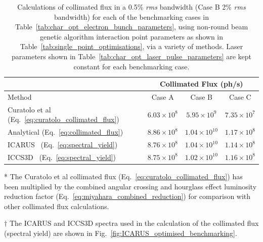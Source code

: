 \documentclass[../main.tex]{subfiles}
\begin{document}
\begin{table}[!h]
\centering
\caption{Calculations of collimated flux in a 0.5\% \textit{rms} bandwidth (Case B 2\% \textit{rms} bandwidth) for each of the benchmarking cases in Table~\ref{tab:char_opt_electron_bunch_parameters}, using non-round beam genetic algorithm interaction point parameters as shown in Table~\ref{tab:single_point_optimisations}, via a variety of methods. Laser parameters shown in Table~\ref{tab:char_opt_laser_pulse_parameters} are kept constant for each benchmarking case.}
\vspace{3mm}
\begin{threeparttable}
\begin{tabular}{lccc}
\hline\hline
 & \multicolumn{3}{c}{Collimated Flux (ph/\si{\second})} \\
\hline
Method & Case A & Case B & Case C \\
\hline 
Curatolo et al~\tnote{*} (Eq.~\ref{eq:curatolo_collimated_flux}) \cite{curatolo2017analytical} & $6.03 \times 10^{8}$ & $5.95\times 10^{9}$ & $7.35\times 10^{7}$ \\
Analytical (Eq.~\ref{eq:collimated_flux}) & $8.86 \times 10^{8}$ & $1.04 \times 10^{10}$ & $1.17\times 10^{8}$ \\
\textsc{ICARUS}~\tnote{$\dagger$} (Eq.~\ref{eq:spectral_yield}) & $8.76\times 10^{8}$ & $1.04\times 10^{10}$ & $1.14\times 10^{8}$ \\
\textsc{ICCS3D}~\tnote{$\dagger$} (Eq.~\ref{eq:spectral_yield}) \cite{krafft2016laser,ranjan2018simulation} & $8.75\times 10^{8}$ & $1.02\times 10^{10}$ & $1.16\times 10^{8}$  \\
\hline\hline
\end{tabular}
\begin{tablenotes}
\item[*]{The Curatolo et al collimated flux (Eq.~\ref{eq:curatolo_collimated_flux}) has been multiplied by the combined angular crossing and hourglass effect luminosity reduction factor (Eq.~\ref{eq:miyahara_combined_reduction}) for comparison with other collimated flux calculations.}
\item[$\dagger$]{The \textsc{ICARUS} and \textsc{ICCS3D} spectra used in the calculation of the collimated flux (spectral yield) are shown in Fig.~\ref{fig:ICARUS_optimised_benchmarking}.}
\end{tablenotes}
\end{threeparttable}
\label{tab:collimated_flux_calculations}
\end{table}
\end{document}
